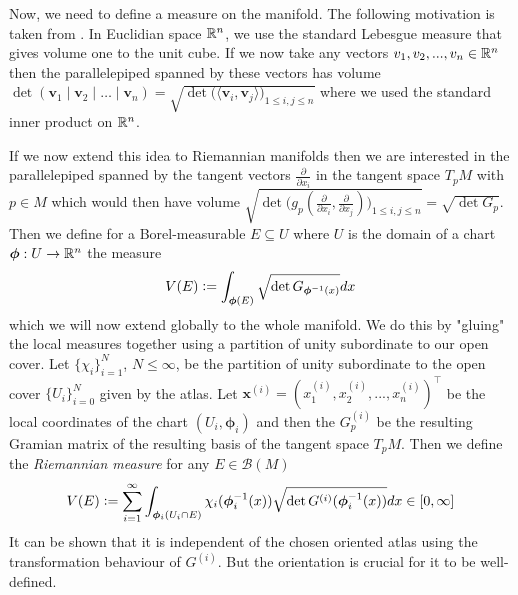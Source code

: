 \documentclass[../master_thesis.tex]{subfiles}
\begin{document}
Now, we need to define a measure on the manifold. 
The following motivation is taken from \cite[3.H.2]{gallot_hulin_lafontaine}.
In Euclidian space $\mathbb{R}^n$, we use the standard Lebesgue measure that gives 
volume one to the unit cube. If we now take any vectors $v_1, v_2, ..., v_n 
\in \mathbb{R}^n$ then the parallelepiped spanned by these vectors has 
volume $\det (\mathbf{v}_1 \mid \mathbf{v}_2 \mid \dots \mid \mathbf{v}_n) 
= \sqrt{ \det \big( \langle \mathbf{v}_i , \mathbf{v}_j \rangle \big)_{1\leq i,j \leq n} }$ where 
we used the standard inner product on $\mathbb{R}^n$. 

If we now extend this idea to Riemannian manifolds then we are interested 
in the parallelepiped spanned by the tangent vectors $\frac{\partial}{\partial x_i}$
in the tangent space $T_p M$ with $p \in M$
which would then have volume $ \sqrt{\det \big( g_p(\frac{\partial}{\partial x_i}, 
\frac{\partial}{\partial x_j}) \big)_{1\leq i,j \leq n} } = 
\sqrt{ \det G_p }$. Then we define for a Borel-measurable $E \subseteq U$ where $U$ is 
the domain of a chart $\boldsymbol{\phi}: U \rightarrow \mathbb{R}^n$ the measure 
\begin{align*}
    V(E) \vcentcolon= \int_{\boldsymbol{\phi}(E)} \sqrt{ \det G_{\boldsymbol{\phi}^{-1}(x)}} dx 
\end{align*} 
which we will now extend globally to the whole manifold. We do this 
by "gluing" the local measures together using a partition of unity subordinate 
to our open cover. 
Let $\{ \chi_i \}_{i=1}^N$, $N \leq \infty$, be the partition of unity 
subordinate to the open cover $\{U_i\}_{i = 0}^N$ given by the atlas. 
Let $\mathbf{x}^{(i)} = (x_1^{(i)}, x_2^{(i)}, ..., x_n^{(i)})^\top$ be the local 
coordinates of the chart $(U_i,\bm{\phi}_i)$ and then the 
$G_p^{(i)}$ be the resulting Gramian matrix of the resulting basis of the tangent space
$T_p M$.
Then we define the 
\textit{Riemannian measure} for any $E \in \mathcal{B}(M)$
\begin{align}
    V(E) \vcentcolon= \sum\limits_{i=1}^\infty \int_{\boldsymbol{\phi}_i(U_i \cap E)}
        \chi_i(\boldsymbol{\phi}_i^{-1}(x)) \sqrt{\det G^{(i)}(\boldsymbol{\phi}_i^{-1}(x))} dx 
        \in [0,\infty] \label{eq:riemannian_measure}
\end{align}
It can be shown that it is independent of the chosen oriented atlas 
using the transformation behaviour of $G^{(i)}$. But the orientation is 
crucial for it to be well-defined. 
\end{document}
